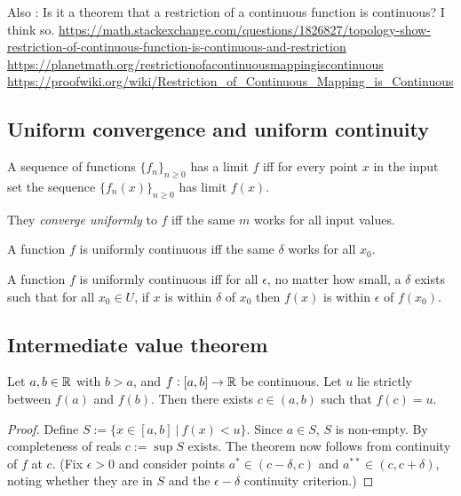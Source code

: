 Also : Is it a theorem that a restriction of a continuous function is continuous? I think so.
\url{https://math.stackexchange.com/questions/1826827/topology-show-restriction-of-continuous-function-is-continuous-and-restriction}
\url{https://planetmath.org/restrictionofacontinuousmappingiscontinuous}
\url{https://proofwiki.org/wiki/Restriction_of_Continuous_Mapping_is_Continuous}


\subsection{Uniform convergence and uniform continuity}

\begin{definition*}
A sequence of functions $\{f_n\}_{n\geq 0}$ has a limit $f$ iff for every point
$x$ in the input set the sequence $\{f_n(x)\}_{n\geq 0}$ has limit $f(x)$.

They \textit{converge uniformly} to $f$ iff the same $m$ works for all input
values.
\end{definition*}

\begin{definition*}
A function $f$ is uniformly continuous iff the same $\delta$ works for all $x_0$.

A function $f$ is uniformly continuous iff for all $\epsilon$, no matter how
small, a $\delta$ exists such that for all $x_0 \in U$, if $x$ is within
$\delta$ of $x_0$ then $f(x)$ is within $\epsilon$ of $f(x_0)$.
\end{definition*}

\subsection{Intermediate value theorem}
\begin{theorem*}
  Let $a, b \in \mathbb{R}$ with $b > a$, and $f:[a,b] \to \mathbb{R}$ be continuous. Let $u$ lie strictly between
  $f(a)$ and $f(b)$. Then there exists $c \in (a, b)$ such that $f(c) = u$.
\end{theorem*}

\begin{proof}
  Define $S := \{x \in [a, b] ~|~ f(x) < u\}$. Since $a \in S$, $S$ is non-empty. By completeness
  of reals $c := \sup S$ exists. The theorem now follows from continuity of $f$ at $c$. (Fix
  $\epsilon > 0$ and consider points $a^* \in (c - \delta, c)$ and $a^{**} \in (c, c + \delta)$,
  noting whether they are in $S$ and the $\epsilon-\delta$ continuity criterion.)
\end{proof}


